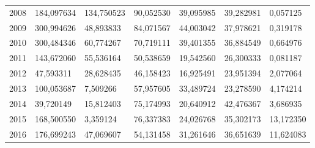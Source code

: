 \begin{table}
\begin{tabular}{p{1cm}p{2cm}p{2cm}p{2cm}p{2cm}p{2cm}p{2cm}}
 2008 &                184,097634 &                          134,750523 &                      90,052530 &                       39,095985 &                           39,282981 &                                   0,057125 \\
 2009 &                300,994626 &                           48,893833 &                      84,071567 &                       44,003042 &                           37,978621 &                                   0,319178 \\
 2010 &                300,484346 &                           60,774267 &                      70,719111 &                       39,401355 &                           36,884549 &                                   0,664976 \\
 2011 &                143,672060 &                           55,536164 &                      50,538659 &                       19,542560 &                           26,300333 &                                   0,081187 \\
 2012 &                 47,593311 &                           28,628435 &                      46,158423 &                       16,925491 &                           23,951394 &                                   2,077064 \\
 2013 &                100,053687 &                            7,509266 &                      57,957605 &                       33,489724 &                           23,278590 &                                   4,174214 \\
 2014 &                 39,720149 &                           15,812403 &                      75,174993 &                       20,640912 &                           42,476367 &                                   3,686935 \\
 2015 &                168,500550 &                            3,359124 &                      76,337383 &                       24,026768 &                           35,302173 &                                  13,172350 \\
 2016 &                176,699243 &                           47,069607 &                      54,131458 &                       31,261646 &                           36,651639 &                                  11,624083 \\
\bottomrule
\end{tabular}
\end{table}
